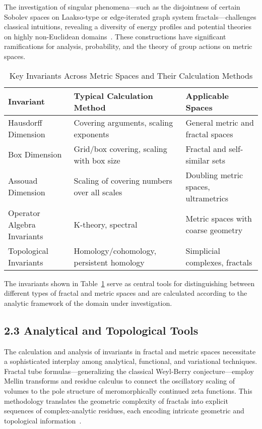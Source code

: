 \documentclass[11pt]{article}
\begin{document}
The investigation of singular phenomena—such as the disjointness of certain Sobolev spaces on Laakso-type or edge-iterated graph system fractals—challenges classical intuitions, revealing a diversity of energy profiles and potential theories on highly non-Euclidean domains~\cite{ref30,ref35}. These constructions have significant ramifications for analysis, probability, and the theory of group actions on metric spaces.

\begin{table}[h]
    \centering
    \caption{Key Invariants Across Metric Spaces and Their Calculation Methods}
    \label{tab:invariants_comparison}
    \begin{tabular}{|l|l|l|}
        \hline
        \textbf{Invariant} & \textbf{Typical Calculation Method} & \textbf{Applicable Spaces} \\
        \hline
        Hausdorff Dimension & Covering arguments, scaling exponents & General metric and fractal spaces \\
        Box Dimension & Grid/box covering, scaling with box size & Fractal and self-similar sets \\
        Assouad Dimension & Scaling of covering numbers over all scales & Doubling metric spaces, ultrametrics \\
        Operator Algebra Invariants & K-theory, spectral & Metric spaces with coarse geometry \\
        Topological Invariants & Homology/cohomology, persistent homology & Simplicial complexes, fractals \\
        \hline
    \end{tabular}
\end{table}

The invariants shown in Table~\ref{tab:invariants_comparison} serve as central tools for distinguishing between different types of fractal and metric spaces and are calculated according to the analytic framework of the domain under investigation.

\subsection{2.3 Analytical and Topological Tools}

The calculation and analysis of invariants in fractal and metric spaces necessitate a sophisticated interplay among analytical, functional, and variational techniques. Fractal tube formulas—generalizing the classical Weyl-Berry conjecture—employ Mellin transforms and residue calculus to connect the oscillatory scaling of volumes to the pole structure of meromorphically continued zeta functions. This methodology translates the geometric complexity of fractals into explicit sequences of complex-analytic residues, each encoding intricate geometric and topological information~\cite{ref21,ref33}.
\end{document}
